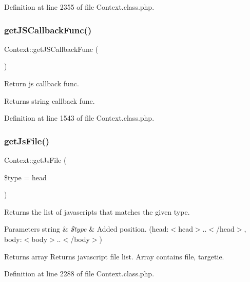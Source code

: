Definition at line 2355 of file Context.\+class.\+php.

\mbox{\label{classContext_ab2e157a87d2b960d78b2c3f35ae7da23}} 
\subsubsection{\texorpdfstring{get\+J\+S\+Callback\+Func()}{getJSCallbackFunc()}}
{\footnotesize\ttfamily Context\+::get\+J\+S\+Callback\+Func (\begin{DoxyParamCaption}{ }\end{DoxyParamCaption})}

Return js callback func. \begin{DoxyReturn}{Returns}
string callback func. 
\end{DoxyReturn}


Definition at line 1543 of file Context.\+class.\+php.

\mbox{\label{classContext_a9989fb9f7be0a978df65e50462460317}} 
\subsubsection{\texorpdfstring{get\+Js\+File()}{getJsFile()}}
{\footnotesize\ttfamily Context\+::get\+Js\+File (\begin{DoxyParamCaption}\item[{}]{\$type = {\ttfamily \textquotesingle{}head\textquotesingle{}} }\end{DoxyParamCaption})}

Returns the list of javascripts that matches the given type.


\begin{DoxyParams}[1]{Parameters}
string & {\em \$type} & Added position. (head\+:$<$head$>$..$<$/head$>$, body\+:$<$body$>$..$<$/body$>$) \\
\hline
\end{DoxyParams}
\begin{DoxyReturn}{Returns}
array Returns javascript file list. Array contains file, targetie. 
\end{DoxyReturn}


Definition at line 2288 of file Context.\+class.\+php.

